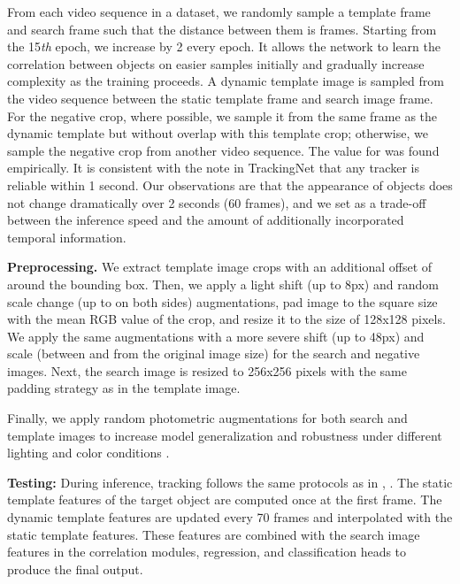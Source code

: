 \documentclass[runningheads]{llncs}
\begin{document}
From each video sequence in a dataset, we randomly sample a template frame  and search frame  such that the distance between them is  frames. 
Starting from the 15\textit{th} epoch, we increase  by 2 every epoch. 
It allows the network to learn the correlation between objects on easier samples initially and gradually increase complexity as the training proceeds.
A dynamic template image is sampled from the video sequence between the static template frame and search image frame. 
For the negative crop, where possible, we sample it from the same frame as the dynamic template but without overlap with this template crop; otherwise, we sample the negative crop from another video sequence.
The value for  was found empirically. 
It is consistent with the note in TrackingNet \cite{trackingnet} that any tracker is reliable within 1 second. 
Our observations are that the appearance of objects does not change dramatically over 2 seconds (60 frames), and we set  as a trade-off between the inference speed and the amount of additionally incorporated temporal information.


\textbf{Preprocessing.} We extract template image crops with an additional offset of  around the bounding box. 
Then, we apply a light shift (up to 8px) and random scale change (up to  on both sides) augmentations, pad image to the square size with the mean RGB value of the crop, and resize it to the size of 128x128 pixels.
We apply the same augmentations with a more severe shift (up to 48px) and scale (between  and  from the original image size) for the search and negative images. 
Next, the search image is resized to 256x256 pixels with the same padding strategy as in the template image.

Finally, we apply random photometric augmentations for both search and template images to increase model generalization and robustness under different lighting and color conditions \cite{albumentations}.

\textbf{Testing:} During inference, tracking follows the same protocols as in \cite{SiamFC}, \cite{SiamRPN}. 
The static template features of the target object are computed once at the first frame. 
The dynamic template features are updated every 70 frames and interpolated with the static template features. 
These features are combined with the search image features in the correlation modules, regression, and classification heads to produce the final output. 
\end{document}
